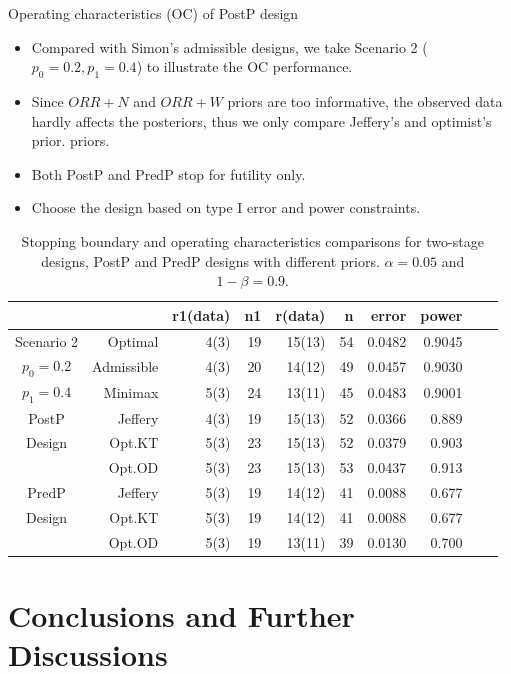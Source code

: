 \begin{frame}{Operating characteristics (OC) of PostP design}

\begin{itemize}
\item
  Compared with Simon's admissible designs, we take Scenario 2
  (\(p_0=0.2, p_1=0.4\)) to illustrate the OC performance.
\item
  Since \(ORR+N\) and \(ORR+W\) priors are too informative, the observed
  data hardly affects the posteriors, thus we only compare Jeffery's and
  optimist's prior. priors.
\item
  Both PostP and PredP stop for futility only.
\item
  Choose the design based on type I error and power constraints.
\end{itemize}

\begin{table}[ht]  \fontsize{7}{9}\selectfont
\centering
\begin{tabular}{crrrrrrrrr}
  \hline
 & & r1(data) & n1 & r(data) & n &  error & power \\ 
  \hline
Scenario 2 & Optimal & 4(3) & 19 & 15(13) & 54 &  0.0482 & 0.9045 \\ 
$p_0=0.2$ &  Admissible & 4(3) & 20 & 14(12) & 49 &  0.0457 & 0.9030 \\ 
$p_1=0.4$ &  Minimax & 5(3) & 24 & 13(11) & 45 &  0.0483 & 0.9001 \\ 
   \hline
   \hline
PostP &  Jeffery & 4(3) & 19 & 15(13) & 52 & 0.0366 & 0.889 \\ 
Design & Opt.KT & 5(3) & 23 & 15(13) & 52 & 0.0379 & 0.903 \\ 
       & Opt.OD & 5(3) & 23 & 15(13) & 53 &  0.0437 & 0.913 \\ 
   \hline
   \hline
PredP &  Jeffery & 5(3) & 19 & 14(12) & 41 & 0.0088 & 0.677 \\ 
Design & Opt.KT & 5(3) & 19 & 14(12) & 41 & 0.0088 & 0.677 \\
       & Opt.OD & 5(3) & 19 & 13(11) & 39 &  0.0130 & 0.700 \\ 
       \hline
\end{tabular}
\tiny{\caption{Stopping boundary and operating characteristics comparisons for two-stage designs, PostP and PredP designs with different priors. $\alpha=0.05$ and $1-\beta=0.9$.}} 
\end{table}

\end{frame}

\section{Conclusions and Further
Discussions}\label{conclusions-and-further-discussions}

